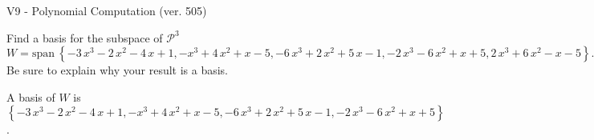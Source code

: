 \begin{exercise}
  \begin{exerciseTitle}V9 - Polynomial Computation (ver. 505)\end{exerciseTitle}
  \begin{exerciseStatement}
    Find a basis for the subspace of \(\mathcal{P}^3\) 
\[W=\mathrm{span}\ \left\{-3 \, x^{3} - 2 \, x^{2} - 4 \, x + 1 , -x^{3} + 4 \, x^{2} + x - 5 , -6 \, x^{3} + 2 \, x^{2} + 5 \, x - 1 , -2 \, x^{3} - 6 \, x^{2} + x + 5 , 2 \, x^{3} + 6 \, x^{2} - x - 5\right\}.\]
 Be sure to explain why your result is a basis.


  \end{exerciseStatement}
  \begin{exerciseAnswer}
   A basis of \(W\) is  \(\left\{-3 \, x^{3} - 2 \, x^{2} - 4 \, x + 1 , -x^{3} + 4 \, x^{2} + x - 5 , -6 \, x^{3} + 2 \, x^{2} + 5 \, x - 1 , -2 \, x^{3} - 6 \, x^{2} + x + 5\right\}\).
  


  \end{exerciseAnswer}
\end{exercise}